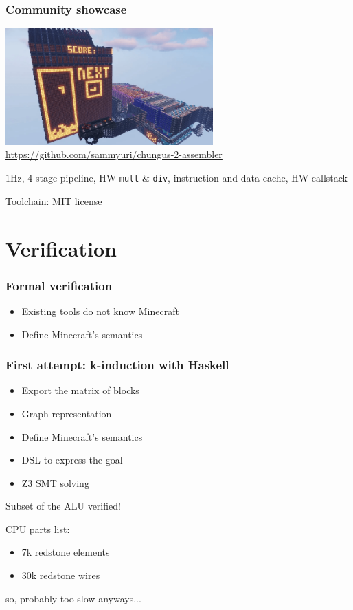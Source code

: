 \documentclass[aspectratio=169]{beamer}
\newcommand{\hw}{HW}
\begin{document}
\begin{frame}
	\frametitle{Community showcase}
	\center
	\includegraphics[width=0.6\textwidth]{imgs/chungus.png}
	\url{https://github.com/sammyuri/chungus-2-assembler}

	$1$Hz, $4$-stage pipeline, \hw{} \texttt{mult} \& \texttt{div}, instruction
	and data cache, \hw{} callstack

	Toolchain: MIT license
\end{frame}

\section{Verification}

\begin{frame}
	\frametitle{Formal verification}
	\begin{itemize}
		\item Existing tools do not know Minecraft
		\item Define Minecraft's semantics
	\end{itemize}
\end{frame}

\begin{frame}
	\frametitle{First attempt: k-induction with Haskell}
	\begin{itemize}
		\item Export the matrix of blocks
		\item Graph representation %
		\item Define Minecraft's semantics
		\item DSL to express the goal
		\item Z3 SMT solving
	\end{itemize}

	Subset of the ALU verified!

	CPU parts list:
	\begin{itemize}
		\item 7k redstone elements
		\item 30k redstone wires
	\end{itemize}

	so, probably too slow anyways...
\end{frame}
\end{document}
